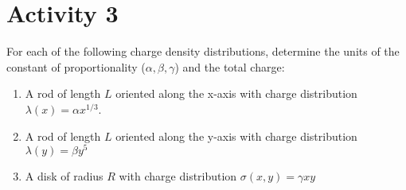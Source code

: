 \documentclass[]{article}
\newcommand{\excerpt}[1]{\colorbox{lightgray}{\parbox{14.8cm}{#1}} \\}
\begin{document}
\section*{Activity 3}%
For each of the following charge density distributions, determine the units of the constant of proportionality ($\alpha, \beta, \gamma$) and the total charge:
\begin{enumerate}
	\item A rod of length $L$ oriented along the x-axis with charge distribution $\lambda (x) = \alpha x^{1/3}$.
	\item A rod of length $L$ oriented along the y-axis with charge distribution $\lambda (y) = \beta y^{5}$
	\item A disk of radius $R$ with charge distribution $\sigma (x,y) = \gamma xy$
\end{enumerate}
\iffalse
\excerpt{For each of the following charge density distributions, determine the units of the constant of proportionality ($\alpha, \beta, \gamma$) and the total charge:
\begin{enumerate}
	\item A rod of length $L$ oriented along the x-axis with charge distribution $\lambda (x) = \alpha x^{1/3}$.
	\item A rod of length $L$ oriented along the y-axis with charge distribution $\lambda (y) = \beta y^{5}$
	\item A disk of radius $R$ with charge distribution $\sigma (x,y) = \gamma xy$
\end{enumerate}}
\fi
\end{document}
